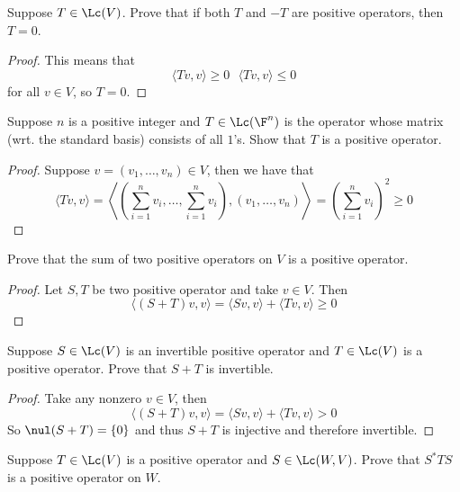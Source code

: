 \documentclass{extarticle}
\begin{document}
\begin{problem}{1}
    Suppose \(T \in \Lc(V)\). Prove that if both \(T\) and \(-T\) are positive operators, then
    \(T = 0\).
\end{problem}

\begin{proof}
This means that
\[\langle Tv,v \rangle \geq 0 \ \ \ \langle Tv,v \rangle \leq 0\]
for all \(v \in V\), so \(T = 0\).
\end{proof}

\begin{problem}{3}
    Suppose \(n\) is a positive integer and \(T \in \Lc(\F^n)\) is the operator whose matrix (wrt.
    the standard basis) consists of all \(1\)'s. Show that \(T\) is a positive operator.
\end{problem}

\begin{proof}
Suppose \(v = (v_1, \ldots, v_n) \in V\), then we have that
\[\langle Tv,v \rangle
= \left\langle \left(\sum_{i=1}^{n} v_i, \ldots, \sum_{i=1}^{n} v_i \right), (v_1, \ldots, v_n) \right\rangle
= \left(\sum_{i=1}^{n} v_i \right)^2 \geq 0\]
\end{proof}

\begin{problem}{6}
    Prove that the sum of two positive operators on \(V\) is a positive operator.
\end{problem}

\begin{proof}
Let \(S, T\) be two positive operator and take \(v \in V\). Then
\[\langle (S+T)v,v \rangle = \langle Sv,v \rangle + \langle Tv,v \rangle \geq 0\]
\end{proof}

\begin{problem}{7}
    Suppose \(S \in \Lc(V)\) is an invertible positive operator and \(T \in \Lc(V)\) is a positive
    operator. Prove that \(S + T\) is invertible.
\end{problem}

\begin{proof}
Take any nonzero \(v \in V\), then
\[\langle (S+T)v,v \rangle = \langle Sv,v \rangle + \langle Tv,v \rangle > 0\]
So \(\nul (S+T) = \{0\}\) and thus \(S+T\) is injective and therefore invertible.
\end{proof}

\begin{problem}{9}
    Suppose \(T \in \Lc(V)\) is a positive operator and \(S \in \Lc(W, V)\). Prove that
    \(S^* T S\) is a positive operator on \(W\).
\end{problem}
\end{document}
